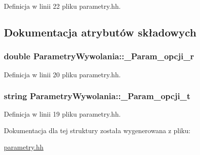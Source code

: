 Definicja w linii 22 pliku parametry.hh.



\subsection{Dokumentacja atrybutów składowych}
\hypertarget{struct_parametry_wywolania_af8a56df8270170afd9ab44c14d6dce86}{
\subsubsection[{\_\-Param\_\-opcji\_\-r}]{\setlength{\rightskip}{0pt plus 5cm}double {\bf ParametryWywolania::\_\-Param\_\-opcji\_\-r}}}
\label{struct_parametry_wywolania_af8a56df8270170afd9ab44c14d6dce86}


Definicja w linii 20 pliku parametry.hh.

\hypertarget{struct_parametry_wywolania_abf36771f054fdc5a8d4dac2f3550e2bf}{
\subsubsection[{\_\-Param\_\-opcji\_\-t}]{\setlength{\rightskip}{0pt plus 5cm}string {\bf ParametryWywolania::\_\-Param\_\-opcji\_\-t}}}
\label{struct_parametry_wywolania_abf36771f054fdc5a8d4dac2f3550e2bf}


Definicja w linii 19 pliku parametry.hh.



Dokumentacja dla tej struktury została wygenerowana z pliku:\begin{DoxyCompactItemize}
\item 
\hyperlink{parametry_8hh}{parametry.hh}\end{DoxyCompactItemize}
